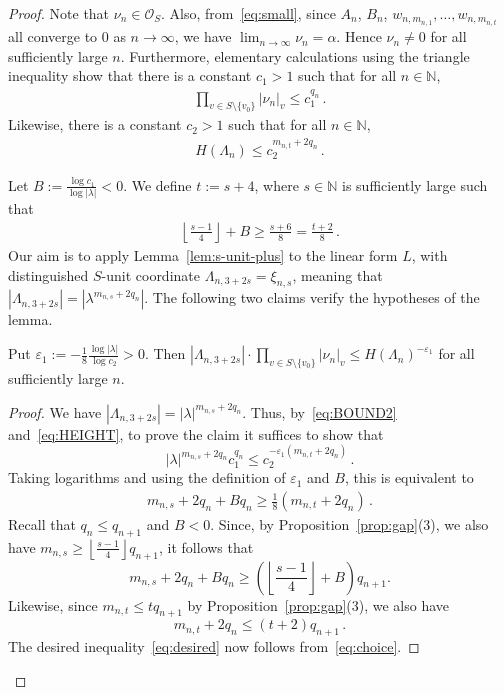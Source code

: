 \documentclass[a4paper,UKenglish,cleveref, autoref, thm-restate]{lipics-v2021}
\begin{document}
\begin{proof}
 Note that $\nu_n \in \mathcal O_S$.  Also, from~\eqref{eq:small}, since $A_n$, $B_n$, $w_{n,m_{n,1}},\ldots,w_{n,m_{n,t}}$
 all converge to $0$ as $n\rightarrow \infty$, we have
 $\lim_{n\rightarrow\infty} \nu_n=\alpha$.  Hence $\nu_n\neq 0$ for 
 all sufficiently large $n$. Furthermore,
elementary calculations using the triangle inequality show that there is a constant $c_1>1$ such that for all $n\in\mathbb N$,
\begin{gather}
\prod_{v\in S \setminus \{v_0\} } |\nu_n|_v \leq c_1^{q_n} \,  .
\label{eq:BOUND2}
\end{gather}
Likewise, there is a constant $c_2 >1$ such that for all $n\in\mathbb N$,
\begin{gather}
H(\Lambda_n) \leq c_2^{m_{n,t}+2q_n} \, . 
\label{eq:HEIGHT}
\end{gather}

Let \(B:=\frac{\log c_1}{\log|\lambda|}<0\).
We define $t:=s+4$, where $s \in \mathbb N$ is sufficiently large such that 
\begin{gather}
{\left\lfloor\frac{s-1}{4}\right\rfloor+B}
\ge
{\frac{s+6}{8}} = {\frac{t+2}{8}} \,  .
\label{eq:choice}
\end{gather}
Our aim is to apply Lemma~\ref{lem:s-unit-plus} to the linear form $L$, with distinguished $S$-unit 
coordinate $\Lambda_{n,3+2s}=\xi_{n,s}$, meaning that $|\Lambda_{n,3+2s}|=|\lambda^{m_{n,s}+2q_n}|$.  The following two claims verify the hypotheses 
of the lemma.
\begin{claim}
\label{claim:one}
Put
\(
\varepsilon_1:=
-\frac{1}{8}\frac{\log|\lambda|}{\log c_2}>0
\).
Then
\(
|\Lambda_{n,3+2s}| \cdot 
\prod_{v\in S\setminus\{v_0\}}|\nu_n|_v
\le
H(\Lambda_n)^{-\varepsilon_1}
\) for all sufficiently large $n$.
\end{claim}
\begin{proof}
We have 
\(
|\Lambda_{n,3+2s}|=|\lambda|^{m_{n,s}+2q_n}.
\)
Thus, by~\eqref{eq:BOUND2} and~\eqref{eq:HEIGHT}, to prove the claim it suffices to show that
\[
|\lambda|^{m_{n,s}+2q_n}c_1^{q_n}
\le
c_2^{-\varepsilon_1(m_{n,t}+2q_n)}\, .
\]
Taking logarithms and using the definition of \(\varepsilon_1\) and $B$, this is equivalent to
\begin{gather}
m_{n,s}+2q_n+Bq_n
\ge
\frac{1}{8}(m_{n,t}+2q_n) \, .
\label{eq:desired}
\end{gather}
Recall that \(q_n\le q_{n+1}\) and \(B<0\).  Since, by Proposition~\ref{prop:gap}(3), we also have
$m_{n,s}\ge \left\lfloor\frac{s-1}{4}\right\rfloor q_{n+1}$, it follows that 
\[
m_{n,s}+2q_n+Bq_n
\ge
\left(\left\lfloor\frac{s-1}{4}\right\rfloor+B\right)q_{n+1}.
\]
Likewise, since $m_{n,t}\leq t q_{n+1}$ by Proposition~\ref{prop:gap}(3), we also have
\[
m_{n,t}+2q_n\le (t+2)q_{n+1} \, .
\]
The desired inequality~\eqref{eq:desired} now follows from~\eqref{eq:choice}.
\end{proof}


\end{proof}
\end{document}
